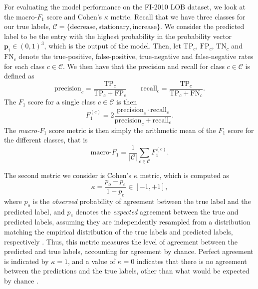 \documentclass{statsmsc}
\begin{document}
{For evaluating the model performance on the FI-2010 \ac{LOB} dataset, we look at the
macro-$F_1$ score and Cohen's $\kappa$ metric.
Recall that we have three classes for our true labels,
$\mathcal{C}=\{\textrm{decrease}, \textrm{stationary}, \textrm{increase}\}$.
We consider the predicted label to be the entry with the highest probability in the
probability vector $\mathbf{p}_i \in (0,1)^3$, which is the output of the model.
Then, let $\textrm{TP}_c$, $\textrm{FP}_c$, $\textrm{TN}_c$
and $\textrm{FN}_c$ denote the true-positive, false-positive, true-negative and
false-negative rates for each class $c \in \mathcal{C}$. We then have that the precision and
recall for class $c \in \mathcal{C}$ is defined as
\begin{equation}
    \textrm{precision}_c= \frac{\textrm{TP}_c}{\textrm{TP}_c+\textrm{FP}_c}
    \qquad \textrm{recall}_c=\frac{\textrm{TP}_c}{\textrm{TP}_c+\textrm{FN}_c}.
\end{equation}
The $F_1$ score for a single class $c \in \mathcal{C}$ is then
\begin{equation}
    F_1^{(c)}=2\frac{\textrm{precision}_c  \cdot \textrm{recall}_c}{\textrm{precision}_c+\textrm{recall}_c} .
\end{equation}
The \textit{macro-}$F_1$ score metric is then simply the arithmetic mean of the $F_1$ score for
the different classes, that is
\begin{equation}
    \textrm{macro-}F_1=\frac{1}{|\mathcal{C}|}  \sum^{}_{c \in \mathcal{C}}  F_1^{(c)}.
\end{equation}

The second metric we consider is Cohen's $\kappa$ metric, which is computed as
\begin{equation}
    \kappa=\frac{p_o-p_e}{1-p_e} \in [-1,+1],
\end{equation}
where $p_o$ is the \textit{observed} probability of agreement between the true label and the
predicted label, and $p_e$ denotes the \textit{expected} agreement between the true and predicted
labels, assuming they are independently resampled from a distribution matching the empirical
distribution of the true labels and predicted labels, respectively \citep{kappa}.
Thus, this metric measures the level of agreement between the predicted and true labels,
accounting for agreement by chance. Perfect agreement is indicated by $\kappa=1$, and a value of
$\kappa=0$ indicates that there is no agreement between the predictions and the true labels,
other than what would be expected by chance \citep{kappa}.

}
\end{document}
